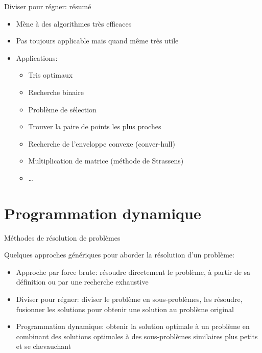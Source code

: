 \begin{frame}{Diviser pour régner: résumé}

\begin{itemize}
\item Mène à des algorithmes très efficaces
\item Pas toujours applicable mais quand même très utile

\bigskip

\item Applications:
\begin{itemize}
\item Tris optimaux
\item Recherche binaire
\item Problème de sélection
\item Trouver la paire de points les plus proches
\item Recherche de l'enveloppe convexe (conver-hull)
\item Multiplication de matrice (méthode de Strassens)
\item \ldots
\end{itemize}
\end{itemize}

\end{frame}

\section{Programmation dynamique}

\begin{frame}{Méthodes de résolution de problèmes}

Quelques approches génériques pour aborder la résolution d'un problème:
\begin{itemize}
\item \alert{Approche par force brute:} résoudre directement le problème, à partir de sa définition ou par une recherche exhaustive
\item \alert{Diviser pour régner:} diviser le problème en sous-problèmes, les résoudre, fusionner les solutions pour obtenir une solution au problème original
\item \alert{Programmation dynamique:} obtenir la solution optimale à un problème en combinant des solutions optimales à des sous-problèmes similaires plus petits et se chevauchant
\end{itemize}

\end{frame}

